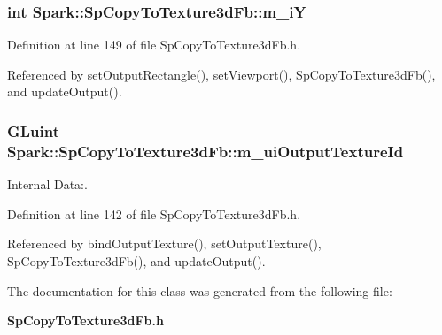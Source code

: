 \subsubsection{\setlength{\rightskip}{0pt plus 5cm}int {\bf Spark::Sp\-Copy\-To\-Texture3d\-Fb::m\_\-i\-Y}\hspace{0.3cm}{\tt  [protected]}}\label{classSpark_1_1SpCopyToTexture3dFb_p5}


Definition at line 149 of file Sp\-Copy\-To\-Texture3d\-Fb.h.

Referenced by set\-Output\-Rectangle(), set\-Viewport(), Sp\-Copy\-To\-Texture3d\-Fb(), and update\-Output().
\subsubsection{\setlength{\rightskip}{0pt plus 5cm}GLuint {\bf Spark::Sp\-Copy\-To\-Texture3d\-Fb::m\_\-ui\-Output\-Texture\-Id}\hspace{0.3cm}{\tt  [protected]}}\label{classSpark_1_1SpCopyToTexture3dFb_p0}


Internal Data:. 

Definition at line 142 of file Sp\-Copy\-To\-Texture3d\-Fb.h.

Referenced by bind\-Output\-Texture(), set\-Output\-Texture(), Sp\-Copy\-To\-Texture3d\-Fb(), and update\-Output().

The documentation for this class was generated from the following file:\begin{CompactItemize}
\item 
{\bf Sp\-Copy\-To\-Texture3d\-Fb.h}\end{CompactItemize}
